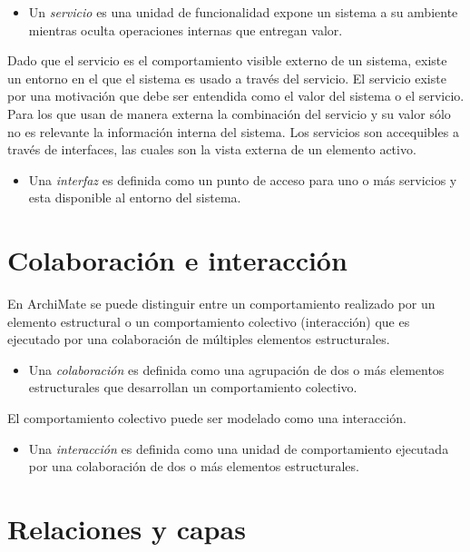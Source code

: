 \begin{itemize}
    \item Un \textit{servicio} es una unidad de funcionalidad expone un sistema a su ambiente mientras oculta operaciones internas que entregan valor.
\end{itemize}

Dado que el servicio es el comportamiento visible externo de un sistema, existe un entorno en el que el sistema es usado a través del servicio. El servicio existe por una motivación que debe ser entendida como el valor del sistema o el servicio. Para los que usan de manera externa la combinación del servicio y su valor sólo no es relevante la información interna del sistema. Los servicios son accequibles a través de interfaces, las cuales son la vista externa de un elemento activo.

\begin{itemize}
    \item Una \textit{interfaz} es definida como un punto de acceso para uno o más servicios y esta disponible al entorno del sistema.
\end{itemize}

\section{Colaboración e interacción}

En ArchiMate se puede distinguir entre un comportamiento realizado por un elemento estructural o un comportamiento colectivo (interacción) que es ejecutado por una colaboración de múltiples elementos estructurales.

\begin{itemize}
    \item Una \textit{colaboración} es definida como una agrupación de dos o más elementos estructurales que desarrollan un comportamiento colectivo.
\end{itemize}

El comportamiento colectivo puede ser modelado como una interacción.

\begin{itemize}
    \item Una \textit{interacción} es definida como una unidad de comportamiento ejecutada por una colaboración de dos o más elementos estructurales.
\end{itemize}

\section{Relaciones y capas}

